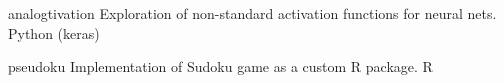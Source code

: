 
\begin{cvhonors}

  \cvhonor
    {analogtivation} %
    {Exploration of non-standard activation functions for neural nets.} %
    {Python (keras)} %
    {\href{https://github.com/rtjohnson12/analogtivation}{\faLink}} %
    
  \cvhonor
    {pseudoku} %
    {Implementation of Sudoku game as a custom R package.} %
    {R} %
    {\href{https://github.com/rtjohnson12/pseudoku}{\faLink}} %


\end{cvhonors}
